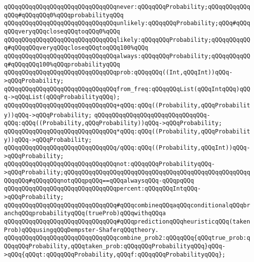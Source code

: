 \newline
\verb|qQQqqQQqqQQqqQQqqQQqqQQqqQQqqQQqnever:qQQqqQQqProbability;qQQqqQQqqQQqqQQq#qQQqqQQq0%qQQqprobabilityqQQq|\newline
\verb|qQQqqQQqqQQqqQQqqQQqqQQqqQQqqQQqunlikely:qQQqqQQqProbability;qQQq#qQQqqQQqveryqQQqcloseqQQqtoqQQq0%qQQq|\newline
\verb|qQQqqQQqqQQqqQQqqQQqqQQqqQQqqQQqlikely:qQQqqQQqProbability;qQQqqQQqqQQq#qQQqqQQqveryqQQqcloseqQQqtoqQQq100%qQQq|\newline
\verb|qQQqqQQqqQQqqQQqqQQqqQQqqQQqqQQqalways:qQQqqQQqProbability;qQQqqQQqqQQq#qQQqqQQq100%qQQqprobabilityqQQq|\newline
\newline
\verb|qQQqqQQqqQQqqQQqqQQqqQQqqQQqqQQqprob:qQQqqQQq((Int,qQQqInt))qQQq->qQQqProbability;|\newline
\verb|qQQqqQQqqQQqqQQqqQQqqQQqqQQqqQQqfrom_freq:qQQqqQQqList(qQQqIntqQQq)qQQq->qQQqList(qQQqProbabilityqQQq);|\newline
\newline
\verb|qQQqqQQqqQQqqQQqqQQqqQQqqQQqqQQq+qQQq:qQQq((Probability,qQQqProbability))qQQq->qQQqProbability;|\newline
\verb|qQQqqQQqqQQqqQQqqQQqqQQqqQQqqQQq-qQQq:qQQq((Probability,qQQqProbability))qQQq->qQQqProbability;|\newline
\verb|qQQqqQQqqQQqqQQqqQQqqQQqqQQqqQQq*qQQq:qQQq((Probability,qQQqProbability))qQQq->qQQqProbability;|\newline
\verb|qQQqqQQqqQQqqQQqqQQqqQQqqQQqqQQq/qQQq:qQQq((Probability,qQQqInt))qQQq->qQQqProbability;|\newline
\verb|qQQqqQQqqQQqqQQqqQQqqQQqqQQqqQQqnot:qQQqqQQqProbabilityqQQq->qQQqProbability;qQQqqQQqqQQqqQQqqQQqqQQqqQQqqQQqqQQqqQQqqQQqqQQqqQQqqQQqqQQq#qQQqqQQqnotqQQqpqQQq==qQQqalwaysqQQq-qQQqpqQQq|\newline
\newline
\verb|qQQqqQQqqQQqqQQqqQQqqQQqqQQqqQQqpercent:qQQqqQQqIntqQQq->qQQqProbability;|\newline
\newline
\verb|qQQqqQQqqQQqqQQqqQQqqQQqqQQqqQQq#qQQqcombineqQQqaqQQqconditionalqQQqbranchqQQqprobabilityqQQq(trueProb)qQQqwithqQQqa|\newline
\verb|qQQqqQQqqQQqqQQqqQQqqQQqqQQqqQQq#qQQqpredictionqQQqheuristicqQQq(takenProb)qQQqusingqQQqDempster-ShaferqQQqtheory.|\newline
\newline
\verb|qQQqqQQqqQQqqQQqqQQqqQQqqQQqqQQqcombine_prob2:qQQqqQQq{qQQqtrue_prob:qQQqqQQqProbability,qQQqtaken_prob:qQQqqQQqProbabilityqQQq}qQQq->qQQq{qQQqt:qQQqqQQqProbability,qQQqf:qQQqqQQqProbabilityqQQq};|\newline
